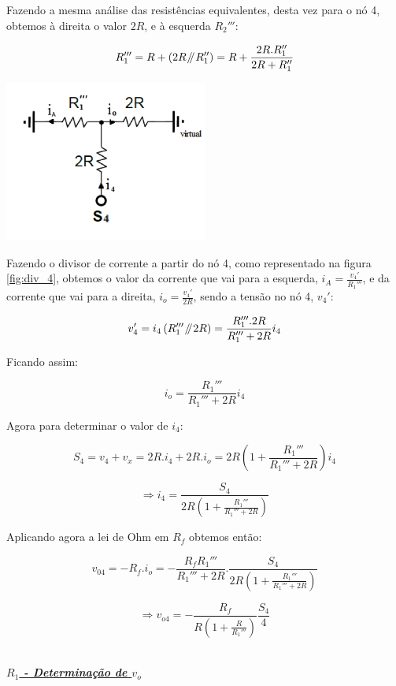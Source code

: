 \documentclass[a4paper,11pt]{report}
\newcommand{\parallelsum}{\mathbin{\!/\mkern-5mu/\!}} %
\begin{document}
Fazendo a mesma análise das resistências equivalentes, desta vez para o nó 4, obtemos à direita o valor $2R$, e à esquerda $R_2'''$:

$$R_1'''=R+\left(2R\parallelsum R_1''\right)=R+\frac{2R.R_1''}{2R+R_1''}$$

\begin{center}
     \includegraphics[angle=0,width=0.5\textwidth]{div_4.png}
     \label{fig:div_4}
     \end{center}

Fazendo o divisor de corrente a partir do nó 4, como representado na figura \ref{fig:div_4}, obtemos o valor da corrente que vai para a esquerda, $i_A=\frac{v_4'}{R_1'''}$, e da corrente que vai para a direita, $i_o=\frac{v_4'}{2R}$, sendo a tensão no nó 4, $v_4'$:

$$v_4'=i_4\left(R_1'''\parallelsum 2R\right)=\frac{R_1'''.2R}{R_1'''+2R}i_4$$

Ficando assim:

$$i_o=\frac{R_1'''}{R_1'''+2R}i_4$$

Agora para determinar o valor de $i_4$:

$$S_4=v_4+v_x=2R.i_4+2R.i_o=2R\left(1+\frac{R_1'''}{R_1'''+2R}\right)i_4$$

$$\Rightarrow i_4=\frac{S_4}{2R\left(1+\frac{R_1'''}{R_1'''+2R}\right)}$$

Aplicando agora a lei de Ohm em $R_f$ obtemos então:

$$v_{04}=-R_f.i_o=-\frac{R_fR_1'''}{R_1'''+2R}.\frac{S_4}{2R\left(1+\frac{R_1'''}{R_1'''+2R}\right)}$$

\begin{equation}\label{eq:v04_1}
\Rightarrow v_{o4}=-\frac{R_f}{R\left(1+\frac{R}{R_1'''}\right)}\frac{S_4}{4}
\end{equation}\\

\par

\large\underline{\textit{\textbf{$R_1$ - Determinação de $v_o$}}}\\
\par
\end{document}

